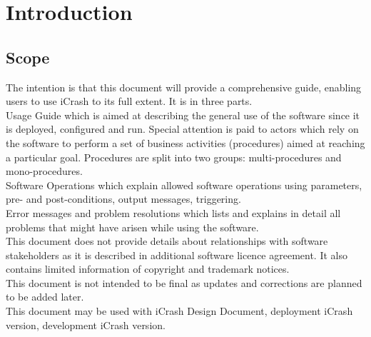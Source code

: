 \chapter{Introduction}
\label{chap:introduction}


\section{Scope}
The intention is that this document will provide a comprehensive guide, enabling
users to use iCrash to its full extent. It is in three parts.\\

Usage Guide which is aimed at describing the general use of the software since
it is deployed, configured and run. Special attention is paid to actors which
rely on the software to perform a set of business activities (procedures) aimed at reaching a particular goal. Procedures are split into two groups: multi-procedures and mono-procedures.\\
 
Software Operations which explain allowed software operations using parameters,
pre- and post-conditions, output messages, triggering.\\

Error messages and problem resolutions which lists and explains in detail all
problems that might have arisen while using the software. \\

This document does not provide details about relationships with software
stakeholders as it is described in additional software licence agreement. It
also contains limited information of copyright and trademark notices.\\

This document is not intended to be final as updates and corrections are planned
to be added later. \\

This document may be used with iCrash Design Document, deployment iCrash
version, development iCrash version.\\





